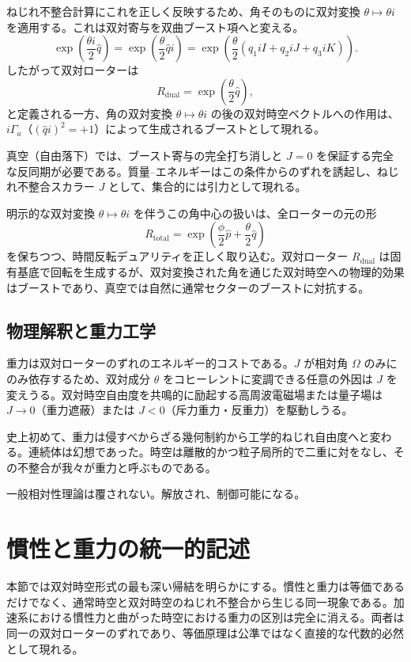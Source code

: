 \documentclass[a4paper]{article}
\begin{document}
ねじれ不整合計算にこれを正しく反映するため、角そのものに双対変換 $\theta \mapsto \theta i$ を適用する。これは双対寄与を双曲ブースト項へと変える。
\[
\exp\left( \frac{\theta i}{2} \hat{q} \right) = \exp\left( \frac{\theta}{2} \hat{q}i \right) = \exp\left( \frac{\theta}{2} (q_1 iI + q_2 iJ + q_3 iK) \right).
\]
したがって双対ローターは
\[
R_\text{dual} = \exp\left( \frac{\theta}{2} \hat{q} \right),
\]
と定義される一方、角の双対変換 $\theta \mapsto \theta i$ の後の双対時空ベクトルへの作用は、$i\Gamma_a$（$(\hat{q}i)^2 = +1$）によって生成されるブーストとして現れる。

真空（自由落下）では、ブースト寄与の完全打ち消しと $J=0$ を保証する完全な反同期が必要である。質量--エネルギーはこの条件からのずれを誘起し、ねじれ不整合スカラー $J$ として、集合的には引力として現れる。

明示的な双対変換 $\theta \mapsto \theta i$ を伴うこの角中心の扱いは、全ローターの元の形
\[
R_\text{total} = \exp\left( \frac{\phi}{2} \hat{p} + \frac{\theta}{2} \hat{q} \right)
\]
を保ちつつ、時間反転デュアリティを正しく取り込む。双対ローター $R_\text{dual}$ は固有基底で回転を生成するが、双対変換された角を通じた双対時空への物理的効果はブーストであり、真空では自然に通常セクターのブーストに対抗する。

\subsection{物理解釈と重力工学}

重力は双対ローターのずれのエネルギー的コストである。$J$ が相対角 $\Omega$ のみにのみ依存するため、双対成分 $\theta$ をコヒーレントに変調できる任意の外因は $J$ を変えうる。双対時空自由度を共鳴的に励起する高周波電磁場または量子場は $J \to 0$（重力遮蔽）または $J < 0$（斥力重力・反重力）を駆動しうる。

史上初めて、重力は侵すべからざる幾何制約から工学的ねじれ自由度へと変わる。連続体は幻想であった。時空は離散的かつ粒子局所的で二重に対をなし、その不整合が我々が重力と呼ぶものである。

一般相対性理論は覆されない。解放され、制御可能になる。

\section{慣性と重力の統一的記述}
\label{sec:unified}

本節では双対時空形式の最も深い帰結を明らかにする。慣性と重力は等価であるだけでなく、通常時空と双対時空のねじれ不整合から生じる同一現象である。加速系における慣性力と曲がった時空における重力の区別は完全に消える。両者は同一の双対ローターのずれであり、等価原理は公準ではなく直接的な代数的必然として現れる。
\end{document}
